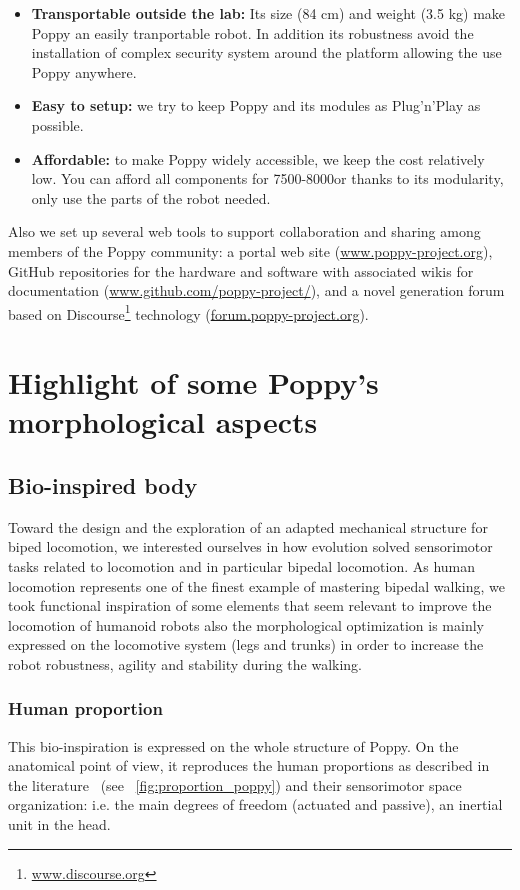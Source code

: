 \begin{itemize}
    \item \textbf{Transportable outside the lab:} Its size (84 cm) and weight (3.5 kg) make Poppy an easily tranportable robot. In addition its robustness avoid the installation of complex security system around the platform allowing the use Poppy anywhere.
    \item \textbf{Easy to setup:} we try to keep Poppy and its modules as Plug’n'Play as possible.
    \item \textbf{Affordable:} to make Poppy widely accessible, we keep the cost relatively low. You can afford all components for 7500-8000\texteuro or thanks to its modularity, only use the parts of the robot needed.
\end{itemize}


Also we set up several web tools to support collaboration and sharing among members of the Poppy community: a portal web site (\url{www.poppy-project.org}), GitHub repositories for the hardware and software with associated wikis for documentation (\url{www.github.com/poppy-project/}), and a novel generation forum based on Discourse\footnote{\url{www.discourse.org}} technology (\url{forum.poppy-project.org}).



\section{Highlight of some Poppy's morphological aspects}


\subsection{Bio-inspired body} %
Toward the design and the exploration of an adapted mechanical structure for biped locomotion, we interested ourselves in how evolution solved sensorimotor tasks related to locomotion and in particular bipedal locomotion. As human locomotion represents one of the finest example of mastering bipedal walking, we took functional inspiration of some elements that seem relevant to improve the locomotion of humanoid robots also the morphological optimization is mainly expressed on the locomotive system (legs and trunks) in order to increase the robot robustness, agility and stability during the walking.

\subsubsection{Human proportion} %
This bio-inspiration is expressed on the whole structure of Poppy. On the anatomical point of view, it reproduces the human proportions as described in the literature~\cite{dufour2005biomecanique}  (see \figurename~\ref{fig:proportion_poppy}) and their sensorimotor space organization: i.e. the main degrees of freedom (actuated and passive), an inertial unit in the head.

